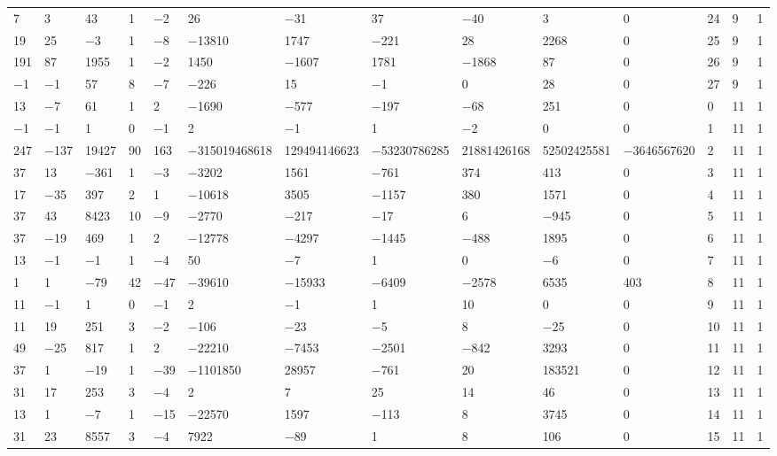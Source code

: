 \documentclass[pdftex]{sigma}
\numberwithin{equation}{section}
\theoremstyle{definition}
\numberwithin{table}{section}
\begin{document}
{\begin{paracol}{3}
\begin{supertabular}{|w{c}{.32cm}w{c}{.32cm}w{c}{.32cm}@{\hspace{.5cm}}w{c}{.2cm}w{c}{.2cm}|@{\hspace{\tabcolsep}}HHHHHHw{c}{.17cm}w{c}{.17cm}w{c}{.17cm}|}
			7 & 3 & 43 & 1 & $-$2 & 26 & $-$31 & 37 & $-$40 & 3 & 0 & 24 & 9 & 1 \\
			19 & 25 & $-$3 & 1 & $-$8 & $-$13810 & 1747 & $-$221 & 28 & 2268 & 0 & 25 & 9 & 1 \\
			191 & 87 & 1955 & 1 & $-$2 & 1450 & $-$1607 & 1781 & $-$1868 & 87 & 0 & 26 & 9 & 1 \\
			$-$1 & $-$1 & 57 & 8 & $-$7 & $-$226 & 15 & $-$1 & 0 & 28 & 0 & 27 & 9 & 1 \\
			13 & $-$7 & 61 & 1 & 2 & $-$1690 & $-$577 & $-$197 & $-$68 & 251 & 0 & 0 & 11 & 1 \\
			$-$1 & $-$1 & 1 & 0 & $-$1 & 2 & $-$1 & 1 & $-$2 & 0 & 0 & 1 & 11 & 1\\
			247 & $-$137 & 19427 & 90 & 163 & $-$315019468618 & 129494146623 & $-$53230786285 & 21881426168 & 52502425581 & $-$3646567620 & 2 & 11 & 1 \\
			37 & 13 & $-$361 & 1 & $-$3 & $-$3202 & 1561 & $-$761 & 374 & 413 & 0 & 3 & 11 & 1 \\
			17 & $-$35 & 397 & 2 & 1 & $-$10618 & 3505 & $-$1157 & 380 & 1571 & 0 & 4 & 11 & 1 \\
			37 & 43 & 8423 & 10 & $-$9 & $-$2770 & $-$217 & $-$17 & 6 & $-$945 & 0 & 5 & 11 & 1 \\
			37 & $-$19 & 469 & 1 & 2 & $-$12778 & $-$4297 & $-$1445 & $-$488 & 1895 & 0 & 6 & 11 & 1 \\
			13 & $-$1 & $-$1 & 1 & $-$4 & 50 & $-$7 & 1 & 0 & $-$6 & 0 & 7 & 11 & 1 \\
			1 & 1 & $-$79 & 42 & $-$47 & $-$39610 & $-$15933 & $-$6409 & $-$2578 & 6535 & 403 & 8 & 11 & 1 \\
			11 & $-$1 & 1 & 0 & $-$1 & 2 & $-$1 & 1 & 10 & 0 & 0 & 9 & 11 & 1 \\
			11 & 19 & 251 & 3 & $-$2 & $-$106 & $-$23 & $-$5 & 8 & $-$25 & 0 & 10 & 11 & 1 \\
			49 & $-$25 & 817 & 1 & 2 & $-$22210 & $-$7453 & $-$2501 & $-$842 & 3293 & 0 & 11 & 11 & 1 \\
			37 & 1 & $-$19 & 1 & $-$39 & $-$1101850 & 28957 & $-$761 & 20 & 183521 & 0 & 12 & 11 & 1 \\
			31 & 17 & 253 & 3 & $-$4 & 2 & 7 & 25 & 14 & 46 & 0 & 13 & 11 & 1 \\
			13 & 1 & $-$7 & 1 & $-$15 & $-$22570 & 1597 & $-$113 & 8 & 3745 & 0 & 14 & 11 & 1 \\
			31 & 23 & 8557 & 3 & $-$4 & 7922 & $-$89 & 1 & 8 & 106 & 0 & 15 & 11 & 1 \\

\end{supertabular}
\end{paracol}}
\end{document}
